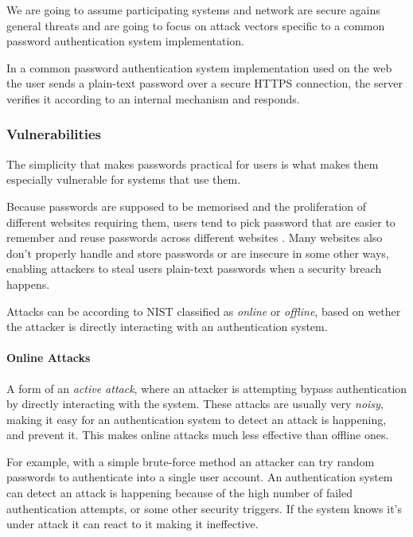 We are going to assume participating systems and network are secure agains general threats and are going to focus on attack vectors specific to a common password authentication system implementation.

In a common password authentication system implementation used on the web the user sends a plain-text password over a secure HTTPS connection, the server verifies it according to an internal mechanism and responds.


\subsubsection{Vulnerabilities}

The simplicity that makes passwords practical for users is what makes them especially vulnerable for systems that use them.

Because passwords are supposed to be memorised and the proliferation of different websites requiring them, users tend to pick password that are easier to remember and reuse passwords across different websites \cite{conklin2004password}.
Many websites also don't properly handle and store passwords or are insecure in some other ways, enabling attackers to steal users plain-text passwords when a security breach happens.

Attacks can be according to NIST \cite{grassi2017} classified as \textit{online} or \textit{offline}, based on wether the attacker is directly interacting with an authentication system.

\paragraph{Online Attacks} A form of an \textit{active attack}, where an attacker is attempting bypass authentication by directly interacting with the system.
These attacks are usually very \textit{noisy}, making it easy for an authentication system to detect an attack is happening, and prevent it.
This makes online attacks much less effective than offline ones.

For example, with a simple brute-force method an attacker can try random passwords to authenticate into a single user account.
An authentication system can detect an attack is happening because of the high number of failed authentication attempts, or some other security triggers. If the system knows it's under attack it can react to it making it ineffective.

